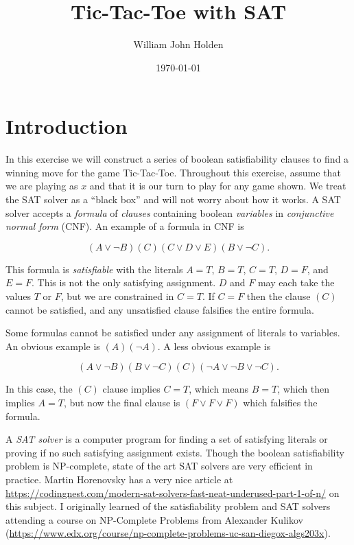 \documentclass[12pt]{article}
\title{Tic-Tac-Toe with SAT}
\author{William John Holden}
\date{\today}
\begin{document}
\maketitle

\section{Introduction}

In this exercise we will construct a series of boolean satisfiability clauses to find a winning move for the game Tic-Tac-Toe.
Throughout this exercise, assume that we are playing as $x$ and that it is our turn to play for any game shown.
We treat the SAT solver as a ``black box'' and will not worry about how it works.
A SAT solver accepts a \textit{formula} of \textit{clauses} containing boolean \textit{variables} in \textit{conjunctive normal form} (CNF).
An example of a formula in CNF is

\begin{equation}(A \vee \neg B)(C)(C \vee D \vee E)(B \vee \neg C).\end{equation}

This formula is \textit{satisfiable} with the literals $A=T$, $B=T$, $C=T$, $D=F$, and $E=F$.
This is not the only satisfying assignment.
$D$ and $F$ may each take the values $T$ or $F$, but we are constrained in $C=T$.
If $C=F$ then the clause $(C)$ cannot be satisfied, and any unsatisfied clause falsifies the entire formula.

Some formulas cannot be satisfied under any assignment of literals to variables. An obvious example is $(A)(\neg A)$.
A less obvious example is

\begin{equation}(A \vee \neg B)(B \vee \neg C)(C)(\neg A \vee \neg B \vee \neg C).\end{equation}

In this case, the $(C)$ clause implies $C=T$, which means $B=T$, which then implies $A=T$, but now the final clause is $(F \vee F \vee F)$ which falsifies the formula.

A \textit{SAT solver} is a computer program for finding a set of satisfying literals or proving if no such satisfying assignment exists.
Though the boolean satisfiability problem is NP-complete, state of the art SAT solvers are very efficient in practice.
Martin Horenovsky has a very nice article at \url{https://codingnest.com/modern-sat-solvers-fast-neat-underused-part-1-of-n/} on this subject.
I originally learned of the satisfiability problem and SAT solvers attending a course on NP-Complete Problems from Alexander Kulikov (\url{https://www.edx.org/course/np-complete-problems-uc-san-diegox-algs203x}).
\end{document}
